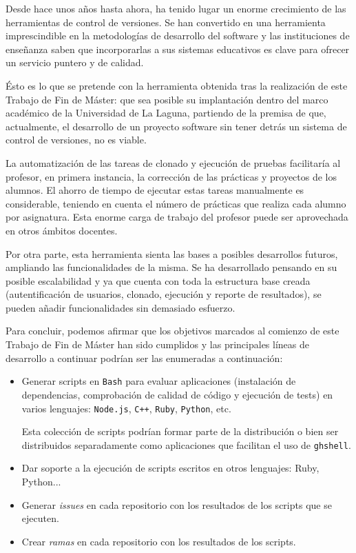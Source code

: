 

Desde hace unos años hasta ahora, ha tenido lugar un enorme crecimiento de las herramientas de control de versiones. Se han convertido en una herramienta imprescindible en la metodologías de desarrollo del software y las instituciones de enseñanza saben que incorporarlas a sus sistemas educativos es clave para ofrecer un servicio puntero y de calidad.
\bigskip

Ésto es lo que se pretende con la herramienta obtenida tras la realización de este Trabajo de Fin de Máster: que sea posible su implantación dentro del marco académico de la Universidad de La Laguna, partiendo de la premisa de que, actualmente, el desarrollo de un proyecto software sin tener detrás un sistema de control de versiones, no es viable.
\bigskip

La automatización de las tareas de clonado y ejecución de pruebas facilitaría al profesor, en primera instancia, la corrección de las prácticas y proyectos de los alumnos. El ahorro de tiempo de ejecutar estas tareas manualmente es considerable, teniendo en cuenta el número de prácticas que realiza cada alumno por asignatura. Esta enorme carga de trabajo del profesor puede ser aprovechada en otros ámbitos docentes.
\bigskip

Por otra parte, esta herramienta sienta las bases a posibles desarrollos futuros, ampliando las funcionalidades de la misma. Se ha desarrollado pensando en su posible escalabilidad y ya que cuenta con toda la estructura base creada (autentificación de usuarios, clonado, ejecución y reporte de resultados), se pueden añadir funcionalidades sin demasiado esfuerzo.
\newpage

Para concluir, podemos afirmar que los objetivos marcados al comienzo de este Trabajo de Fin de Máster han sido cumplidos y las principales líneas de desarrollo a continuar podrían ser las enumeradas a continuación:  

\begin{itemize}
	\item Generar scripts en \verb|Bash| para evaluar aplicaciones (instalación de dependencias, comprobación de calidad de código y ejecución de tests) en varios lenguajes: \verb|Node.js|, \verb|C++|, \verb|Ruby|, \verb|Python|, etc.
	\bigskip
	
	Esta colección de scripts podrían formar parte de la distribución o bien ser distribuidos separadamente como aplicaciones que facilitan el uso de \verb|ghshell|.
	
	\item Dar soporte a la ejecución de scripts escritos en otros lenguajes: Ruby, Python...
	\item Generar {\it issues} en cada repositorio con los resultados de los scripts que se ejecuten.
	\item Crear {\it ramas} en cada repositorio con los resultados de los scripts.
\end{itemize}